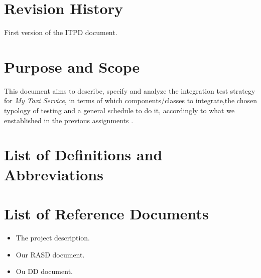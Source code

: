 
\section{Revision History}
First version of the ITPD document.
\section{Purpose and Scope}
This document aims to describe, specify and analyze the integration test strategy for \textit{My Taxi Service}, 
in terms of which components/classes to integrate,the chosen typology of testing and a general schedule to do it,
 accordingly to what we enstablished in the previous assignments . \\


\section{List of Definitions and Abbreviations}


\section{List of Reference Documents}
\begin{itemize}
\item The project description.
\item Our RASD document.
\item Ou DD document.
\end{itemize}
